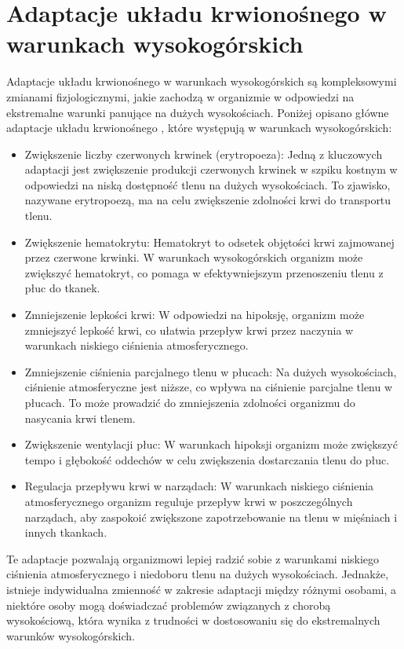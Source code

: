 \section{Adaptacje układu krwionośnego w warunkach wysokogórskich}
Adaptacje układu krwionośnego w warunkach wysokogórskich są kompleksowymi zmianami fizjologicznymi, jakie zachodzą w organizmie w odpowiedzi na ekstremalne warunki panujące na dużych wysokościach. Poniżej opisano główne adaptacje układu krwionośnego \cite{adaptacja}, które występują w warunkach wysokogórskich: 
\begin{itemize}
    \item Zwiększenie liczby czerwonych krwinek (erytropoeza): Jedną z kluczowych adaptacji jest zwiększenie produkcji czerwonych krwinek w szpiku kostnym w odpowiedzi na niską dostępność tlenu na dużych wysokościach. To zjawisko, nazywane erytropoezą, ma na celu zwiększenie zdolności krwi do transportu tlenu.
    \item Zwiększenie hematokrytu: Hematokryt to odsetek objętości krwi zajmowanej przez czerwone krwinki. W warunkach wysokogórskich organizm może zwiększyć hematokryt, co pomaga w efektywniejszym przenoszeniu tlenu z płuc do tkanek.
    \item Zmniejszenie lepkości krwi: W odpowiedzi na hipoksję, organizm może zmniejszyć lepkość krwi, co ułatwia przepływ krwi przez naczynia w warunkach niskiego ciśnienia atmosferycznego.
    \item Zmniejszenie ciśnienia parcjalnego tlenu w płucach: Na dużych wysokościach, ciśnienie atmosferyczne jest niższe, co wpływa na ciśnienie parcjalne tlenu w płucach. To może prowadzić do zmniejszenia zdolności organizmu do nasycania krwi tlenem.
    \item Zwiększenie wentylacji płuc: W warunkach hipoksji organizm może zwiększyć tempo i głębokość oddechów w celu zwiększenia dostarczania tlenu do płuc.
    \item Regulacja przepływu krwi w narządach: W warunkach niskiego ciśnienia atmosferycznego organizm reguluje przepływ krwi w poszczególnych narządach, aby zaspokoić zwiększone zapotrzebowanie na tlenu w mięśniach i innych tkankach.
\end{itemize}

Te adaptacje pozwalają organizmowi lepiej radzić sobie z warunkami niskiego ciśnienia atmosferycznego i niedoboru tlenu na dużych wysokościach. Jednakże, istnieje indywidualna zmienność w zakresie adaptacji między różnymi osobami, a niektóre osoby mogą doświadczać problemów związanych z chorobą wysokościową, która wynika z trudności w dostosowaniu się do ekstremalnych warunków wysokogórskich.

